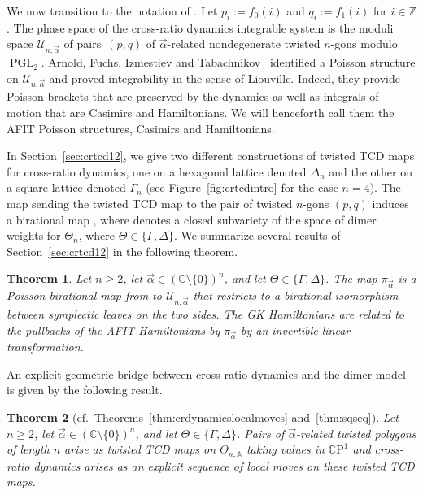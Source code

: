 \documentclass[pdftex]{sigma}
\numberwithin{equation}{section}
\newtheorem{Theorem}{Theorem}[section]
\newcommand{\Z}{{\mathbb Z}}
\newcommand{\C}{{\mathbb C}}
\newcommand{\CP}{{\mathbb C\mathrm P}}
\newcommand{\A}{{\mathbb A}}
\newcommand{\PGL}{\operatorname{PGL}}
\newcommand{\ra}{\rightarrow}
\begin{document}
	We now transition to the notation of \cite{AFIT}. Let $p_i := f_0(i)$ and $q_i := f_1(i)$ for $i \in \Z$.
	The phase space of the cross-ratio dynamics integrable system is the moduli space ${\mathcal U}_{n,\vec\alpha}$ of pairs~$(p,q)$ of $\vec\alpha$-related nondegenerate twisted $n$-gons modulo $\PGL_2$. Arnold, Fuchs, Izmestiev and Tabachnikov~\cite{AFIT} identified a Poisson structure on ${\mathcal U}_{n,\vec\alpha}$ and proved integrability in the sense of Liouville. Indeed, they provide Poisson brackets that are preserved by the dynamics as well as integrals of motion that are Casimirs and Hamiltonians. We will henceforth call them the AFIT Poisson structures, Casimirs and Hamiltonians.
	
	In Section~\ref{sec:crtcd12}, we give two different constructions of twisted TCD maps for cross-ratio dynamics, one on a hexagonal lattice denoted $\Delta_n$ and the other on a square lattice denoted $\Gamma_n$ (see Figure~\ref{fig:crtcdintro} for the case $n=4$). The map sending the twisted TCD map to the pair of twisted $n$-gons $(p,q)$ induces a birational map \smash{$\pi_{\vec{\alpha}}\colon \mathcal X_{N_{\Theta_n},\vec \alpha}^\lambda \ra {\mathcal U}_{n,\vec\alpha}$}, where  denotes a closed subvariety of the space of dimer weights for $\Theta_n$, where $\Theta \in \{\Gamma,\Delta\}$. We summarize several results of Section~\ref{sec:crtcd12} in the following theorem.
	\begin{Theorem}
		\label{thm:main1}
		Let $n\geq2$, let $\vec{\alpha}\in(\C\setminus\{0\})^n$, and let $\Theta \in \{\Gamma,\Delta\}$. The map $\pi_{\vec{\alpha}}$ is a Poisson birational map from  to ${\mathcal U}_{n,\vec\alpha}$ that restricts to a birational isomorphism between symplectic leaves on the two sides. The GK Hamiltonians are related to the pullbacks of the AFIT Hamiltonians by $\pi_{\vec{\alpha}}$ by an invertible linear transformation.
	\end{Theorem}	
	
	An explicit geometric bridge between cross-ratio dynamics and the dimer model is given by the following result.
	
	\begin{Theorem}[cf.\ Theorems~\ref{thm:crdynamicslocalmoves} and~\ref{thm:sqseq}] \label{thm:main2}
		Let $n\geq2$, let $\vec{\alpha}\in(\C\setminus\{0\})^n$, and let $\Theta \in \{\Gamma,\Delta\}$. Pairs of $\vec{\alpha}$-related twisted polygons of length $n$ arise as twisted TCD maps on $\Theta_{n,\A}$ taking values in $\CP^1$ and cross-ratio dynamics arises as an explicit sequence of local moves on these twisted TCD maps.
	\end{Theorem}
	
\end{document}
